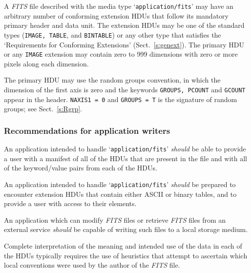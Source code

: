 \documentclass[onecolumn]{aa}
\begin{document}
  A {\em FITS\/} file described with the media type `{\tt application/fits}' may have
  an arbitrary number of conforming extension HDUs
  that follow its mandatory primary header and data unit.    
  The extension HDUs may be one of the standard types ({\tt IMAGE,
  TABLE}, and {\tt BINTABLE}) or any other type that satisfies the
  `Requirements for Conforming Extensions' (Sect.\ \ref{s:genext}).
  The primary HDU or any {\tt IMAGE} extension may contain zero to 999   
  dimensions with zero or more pixels along each dimension.

  The primary HDU may use the random groups convention, in which the dimension
  of the first axis is zero and the keywords {\tt GROUPS, PCOUNT} and {\tt GCOUNT}
  appear in the header.  {\tt NAXIS1 = 0} and {\tt GROUPS = T} is the signature of
  random groups; see Sect.\ \ref{s:Rgrp}.

\subsubsection{Recommendations for application writers}

  An application intended to handle `{\tt application/fits}' {\em should} be able
  to provide a user with a manifest of all of the HDUs that are present
  in the file and with all of the keyword/value pairs from each of the
  HDUs.

  An application intended to handle `{\tt application/fits}' {\em should} be
  prepared to encounter extension HDUs that contain either ASCII or binary
  tables, and to provide a user with access to their elements.

  An application which can modify  {\em FITS\/} files or retrieve {\em FITS\/} files
  from an external service {\em should} be capable of writing such files to a
  local storage medium.

  Complete interpretation of the meaning and intended use of the data
  in each of the HDUs typically requires the use of heuristics that
  attempt to ascertain which local conventions were used by the author
  of the {\em FITS\/} file.
\end{document}
